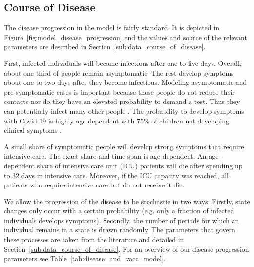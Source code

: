 \subsection{Course of Disease}
\label{sub:model_course_of_disease}

The disease progression in the model is fairly standard. It is depicted in
Figure~\ref{fig:model_disease_progression} and the values and source of the relevant
parameters are described in Section~\ref{sub:data_course_of_disease}.

First, infected individuals will become infectious after one to five days. Overall,
about one third of people remain asymptomatic. The rest develop symptoms about one to
two days after they become infectious. Modeling asymptomatic and pre-symptomatic cases
is important because those people do not reduce their contacts nor do they have an
elevated probability to demand a test. Thus they can potentially infect many other
people \citep{Donsimoni2020}. The probability to develop
symptoms with Covid-19 is highly age dependent with 75\% of children not developing
clinical symptoms \citep{Davies2020}.

A small share of symptomatic people will develop strong symptoms that require intensive
care. The exact share and time span is age-dependent. An age-dependent share of intensive
care unit (ICU) patients will die after spending up to 32 days in intensive care.
Moreover, if the ICU capacity was reached, all patients who require intensive care but do
not receive it die.


We allow the progression of the disease to be stochastic in two ways: Firstly, state
changes only occur with a certain probability (e.g. only a fraction of infected
individuals develops symptoms). Secondly, the number of periods for which an individual
remains in a state is drawn randomly. The parameters that govern these processes are
taken from the literature and detailed in Section~\ref{sub:data_course_of_disease}. For
an overview of our disease progression parameters see
Table~\ref{tab:disease_and_vacc_model}.


